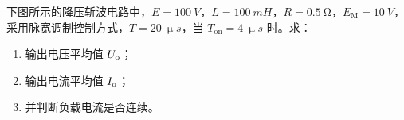 \documentclass[电力电子]{subfiles}
\begin{document}
\begin{ti}[10 分]
	下图所示的降压斩波电路中，$E = \SI{100}{V}$，$L = \SI{100}{mH}$，$R = \SI{0.5}{\ohm}$，$E_{\mathrm{M}} = \SI{10}{V}$，采用脉宽调制控制方式，$T = \SI{20}{\upmu s}$，当 $T_{\mathrm{on}} = \SI{4}{\upmu s}$ 时。求：
	\begin{enumerate}
		\item 输出电压平均值 $U_{\mathrm{o}}$；
		\item 输出电流平均值 $I_{\mathrm{o}}$；
		\item 并判断负载电流是否连续。
	\end{enumerate}
\end{ti}
\end{document}
